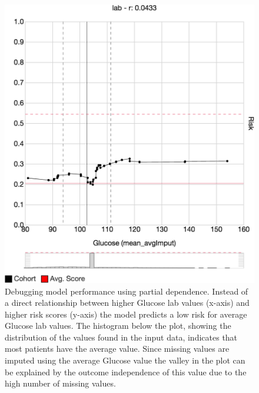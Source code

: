 \begin{figure}[t]
\centering
\begin{minipage}[c]{0.35\textwidth}
\includegraphics[width=\linewidth]{figs/prospector/debug} %
\end{minipage}\hfill
\begin{minipage}[c]{0.6\textwidth}
\caption{
Debugging model performance using partial dependence.
Instead of a direct relationship between higher Glucose lab values (x-axis) and higher risk scores (y-axis)
the model predicts a low risk for average Glucose lab values.
The histogram below the plot, showing the distribution of the values found in the input data, indicates that most patients have the average value.
Since missing values are imputed using the average Glucose value the valley in the plot
can be explained by the outcome independence of this value due to the high number of missing values.
}
\label{figs:prospector_debug}
\end{minipage}
\end{figure}